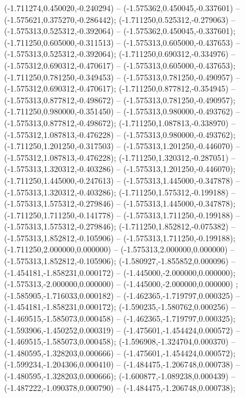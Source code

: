  (-1.711274,0.450020,-0.240294) -- (-1.575362,0.450045,-0.337601) -- (-1.575621,0.375270,-0.286442);
 (-1.711250,0.525312,-0.279063) -- (-1.575313,0.525312,-0.392064) -- (-1.575362,0.450045,-0.337601);
 (-1.711250,0.605000,-0.311513) -- (-1.575313,0.605000,-0.437653) -- (-1.575313,0.525312,-0.392064);
 (-1.711250,0.690312,-0.334976) -- (-1.575312,0.690312,-0.470617) -- (-1.575313,0.605000,-0.437653);
 (-1.711250,0.781250,-0.349453) -- (-1.575313,0.781250,-0.490957) -- (-1.575312,0.690312,-0.470617);
 (-1.711250,0.877812,-0.354945) -- (-1.575313,0.877812,-0.498672) -- (-1.575313,0.781250,-0.490957);
 (-1.711250,0.980000,-0.351450) -- (-1.575313,0.980000,-0.493762) -- (-1.575313,0.877812,-0.498672);
 (-1.711250,1.087813,-0.338970) -- (-1.575312,1.087813,-0.476228) -- (-1.575313,0.980000,-0.493762);
 (-1.711250,1.201250,-0.317503) -- (-1.575313,1.201250,-0.446070) -- (-1.575312,1.087813,-0.476228);
 (-1.711250,1.320312,-0.287051) -- (-1.575313,1.320312,-0.403286) -- (-1.575313,1.201250,-0.446070);
 (-1.711250,1.445000,-0.247613) -- (-1.575313,1.445000,-0.347878) -- (-1.575313,1.320312,-0.403286);
 (-1.711250,1.575312,-0.199188) -- (-1.575313,1.575312,-0.279846) -- (-1.575313,1.445000,-0.347878);
 (-1.711250,1.711250,-0.141778) -- (-1.575313,1.711250,-0.199188) -- (-1.575313,1.575312,-0.279846);
 (-1.711250,1.852812,-0.075382) -- (-1.575313,1.852812,-0.105906) -- (-1.575313,1.711250,-0.199188);
 (-1.711250,2.000000,0.000000) -- (-1.575313,2.000000,0.000000) -- (-1.575313,1.852812,-0.105906);
 (-1.580927,-1.855852,0.000096) -- (-1.454181,-1.858231,0.000172) -- (-1.445000,-2.000000,0.000000);
 (-1.575313,-2.000000,0.000000) -- (-1.445000,-2.000000,0.000000) ;
 (-1.585905,-1.716033,0.000182) -- (-1.462365,-1.719797,0.000325) -- (-1.454181,-1.858231,0.000172);
 (-1.590235,-1.580762,0.000256) -- (-1.469515,-1.585073,0.000458) -- (-1.462365,-1.719797,0.000325);
 (-1.593906,-1.450252,0.000319) -- (-1.475601,-1.454424,0.000572) -- (-1.469515,-1.585073,0.000458);
 (-1.596908,-1.324704,0.000370) -- (-1.480595,-1.328203,0.000666) -- (-1.475601,-1.454424,0.000572);
 (-1.599234,-1.204306,0.000410) -- (-1.484475,-1.206748,0.000738) -- (-1.480595,-1.328203,0.000666);
 (-1.600877,-1.089238,0.000439) -- (-1.487222,-1.090378,0.000790) -- (-1.484475,-1.206748,0.000738);
